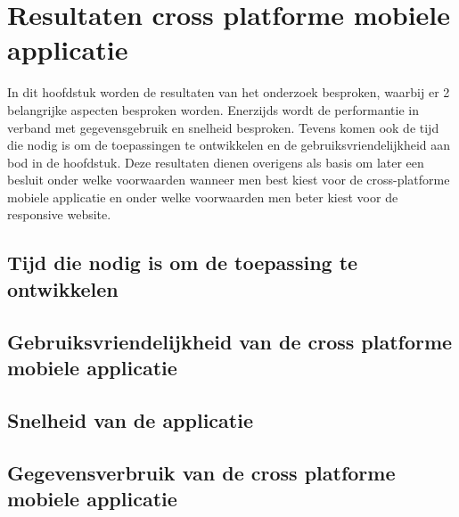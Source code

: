 \chapter{Resultaten cross platforme mobiele applicatie}
\label{ch:resultatencrossplatformapp}
In dit hoofdstuk worden de resultaten van het onderzoek besproken, waarbij er 2 belangrijke aspecten besproken worden.
Enerzijds wordt de performantie in verband met gegevensgebruik en  snelheid besproken.
Tevens komen ook de tijd die nodig is om de toepassingen te ontwikkelen en de gebruiksvriendelijkheid aan bod in de hoofdstuk.
Deze resultaten dienen overigens als basis om later een besluit onder welke voorwaarden wanneer men best kiest voor de
cross-platforme mobiele applicatie en onder welke voorwaarden men beter kiest voor de responsive website.

\section{Tijd die nodig is om de toepassing te ontwikkelen}

\section{Gebruiksvriendelijkheid van de cross platforme mobiele applicatie}

\section{Snelheid van de applicatie}

\section{Gegevensverbruik van de cross platforme mobiele applicatie}
